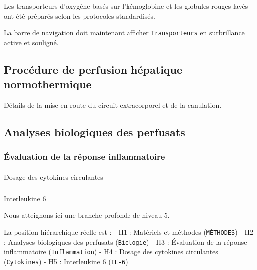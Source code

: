 \documentclass[
  french,
  10pt,
  a4paper,
]{scrartcl}
\makeatletter
\let\oldparagraph\paragraph
\renewcommand{\paragraph}{
    \@ifstar
      \xxxParagraphStar
      \xxxParagraphNoStar
  }
\newcommand{\xxxParagraphStar}[1]{\oldparagraph*{#1}\mbox{}}
\newcommand{\xxxParagraphNoStar}[1]{\oldparagraph{#1}\mbox{}}
\let\oldsubparagraph\subparagraph
\renewcommand{\subparagraph}{
    \@ifstar
      \xxxSubParagraphStar
      \xxxSubParagraphNoStar
  }
\newcommand{\xxxSubParagraphStar}[1]{\oldsubparagraph*{#1}\mbox{}}
\newcommand{\xxxSubParagraphNoStar}[1]{\oldsubparagraph{#1}\mbox{}}
\makeatother
\begin{document}
Les transporteurs d'oxygène basés sur l'hémoglobine et les globules
rouges lavés ont été préparés selon les protocoles standardisés.

La barre de navigation doit maintenant afficher \texttt{Transporteurs}
en surbrillance active et souligné.

\newpage



\subsection{Procédure de perfusion hépatique
normothermique}\label{procuxe9dure-de-perfusion-huxe9patique-normothermique}

Détails de la mise en route du circuit extracorporel et de la
canulation.

\newpage


\subsection{Analyses biologiques des
perfusats}\label{analyses-biologiques-des-perfusats}


\subsubsection{Évaluation de la réponse
inflammatoire}\label{uxe9valuation-de-la-ruxe9ponse-inflammatoire}


\paragraph{Dosage des cytokines
circulantes}\label{dosage-des-cytokines-circulantes}



\subparagraph{Interleukine 6}\label{interleukine-6}

Nous atteignons ici une branche profonde de niveau 5.

La position hiérarchique réelle est : - H1 : Matériels et méthodes
(\texttt{MÉTHODES}) - H2 : Analyses biologiques des perfusats
(\texttt{Biologie}) - H3 : Évaluation de la réponse inflammatoire
(\texttt{Inflammation}) - H4 : Dosage des cytokines circulantes
(\texttt{Cytokines}) - H5 : Interleukine 6 (\texttt{IL-6})
\end{document}
